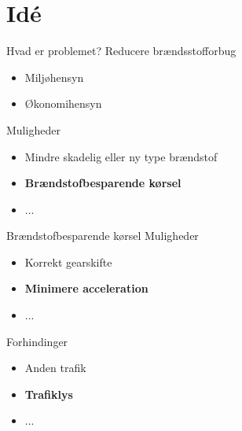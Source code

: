 \section{Idé}

\begin{frame}{Hvad er problemet?}
Reducere brændsstofforbug
\begin{itemize}
\item Miljøhensyn
\item Økonomihensyn
\end{itemize}

Muligheder
\begin{itemize}
\item Mindre skadelig eller ny type brændstof
\item \textbf{Brændstofbesparende kørsel}
\item ...
\end{itemize}
\end{frame}

\begin{frame}{Brændstofbesparende kørsel}
Muligheder
\begin{itemize}
\item Korrekt gearskifte
\item \textbf{Minimere acceleration}
\item ...
\end{itemize}

Forhindinger
\begin{itemize}
\item Anden trafik
\item \textbf{Trafiklys}
\item ...
\end{itemize}

\end{frame}


